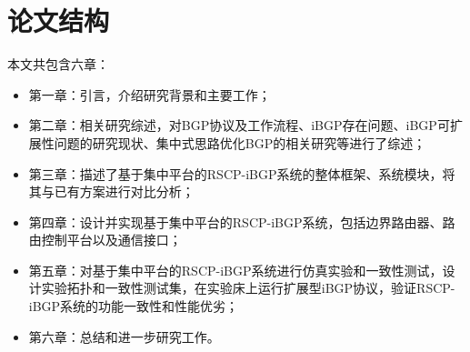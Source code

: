 \section{论文结构}
本文共包含六章：
\begin{itemize}
\item 第一章：引言，介绍研究背景和主要工作；
\item 第二章：相关研究综述，对BGP协议及工作流程、iBGP存在问题、iBGP可扩展性问题的研究现状、集中式思路优化BGP的相关研究等进行了综述；
\item 第三章：描述了基于集中平台的RSCP-iBGP系统的整体框架、系统模块，将其与已有方案进行对比分析；
\item 第四章：设计并实现基于集中平台的RSCP-iBGP系统，包括边界路由器、路由控制平台以及通信接口；
\item 第五章：对基于集中平台的RSCP-iBGP系统进行仿真实验和一致性测试，设计实验拓扑和一致性测试集，在实验床上运行扩展型iBGP协议，验证RSCP-iBGP系统的功能一致性和性能优劣；
\item 第六章：总结和进一步研究工作。
\end{itemize}
